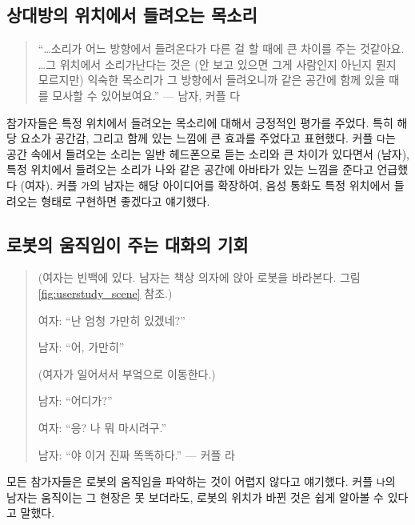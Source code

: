 

\subsection{상대방의 위치에서 들려오는 목소리}

\begin{quote}
``\ldots 소리가 어느 방향에서 들려온다가 다른 걸 할 때에 큰 차이를 주는 것같아요. \ldots 그 위치에서 소리가난다는 것은 (안 보고 있으면 그게 사람인지 아닌지 뭔지 모르지만) 익숙한 목소리가 그 방향에서 들려오니까 같은 공간에 함께 있을 때를 모사할 수 있어보여요.'' --- 남자, 커플 다
\end{quote}

참가자들은 특정 위치에서 들려오는 목소리에 대해서 긍정적인 평가를 주었다. 특히 해당 요소가 공간감, 그리고 함께 있는 느낌에 큰 효과를 주었다고 표현했다. 커플 \texttt{다}는 공간 속에서 들려오는 소리는 일반 헤드폰으로 듣는 소리와 큰 차이가 있다면서 (남자), 특정 위치에서 들려오는 소리가 나와 같은 공간에 아바타가 있는 느낌을 준다고 언급했다 (여자). 커플 \texttt{가}의 남자는 해당 아이디어를 확장하여, 음성 통화도 특정 위치에서 들려오는 형태로 구현하면 좋겠다고 얘기했다.



\subsection{로봇의 움직임이 주는 대화의 기회}

\begin{quotation}
(여자는 빈백에 있다. 남자는 책상 의자에 앉아 로봇을 바라본다. 그림 \ref{fig:userstudy_scene} 참조.)

여자: ``난 엄청 가만히 있겠네?''

남자: ``어, 가만히''

(여자가 일어서서 부엌으로 이동한다.)

남자: ``어디가?''

여자: ``응? 나 뭐 마시려구.''

남자: ``야 이거 진짜 똑똑하다.'' --- 커플 라
\end{quotation}

모든 참가자들은 로봇의 움직임을 파악하는 것이 어렵지 않다고 얘기했다. 커플 \texttt{나}의 남자는 움직이는 그 현장은 못 보더라도, 로봇의 위치가 바뀐 것은 쉽게 알아볼 수 있다고 말했다. 

